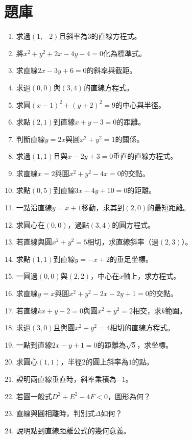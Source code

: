 \section{題庫}
\begin{enumerate}[label=\arabic*.]
    \item 求過$(1, -2)$且斜率為$3$的直線方程式。
    \item 將$x^2 + y^2 + 2x - 4y - 4 = 0$化為標準式。
    \item 求直線$2x - 3y + 6 = 0$的斜率與截距。
    \item 求過$(0, 0)$與$(3, 4)$的直線方程式。
    \item 求圓$(x - 1)^2 + (y + 2)^2 = 9$的中心與半徑。
    \item 求點$(2, 1)$到直線$x + y - 3 = 0$的距離。
    \item 判斷直線$y = 2x$與圓$x^2 + y^2 = 1$的關係。
    \item 求過$(1, 1)$且與$x - 2y + 3 = 0$垂直的直線方程式。
    \item 求直線$x = 2$與圓$x^2 + y^2 - 4x = 0$的交點。
    \item 求點$(0, 5)$到直線$3x - 4y + 10 = 0$的距離。
    \item 一點沿直線$y = x + 1$移動，求其到$(2, 0)$的最短距離。
    \item 求圓心在$(0, 0)$，過點$(3, 4)$的圓方程式。
    \item 若直線與圓$x^2 + y^2 = 5$相切，求直線斜率（過$(2, 3)$）。
    \item 求點$(1, 1)$到直線$y = -x + 2$的垂足坐標。
    \item 一圓過$(0, 0)$與$(2, 2)$，中心在$x$軸上，求方程式。
    \item 求直線$y = x$與圓$x^2 + y^2 - 2x - 2y + 1 = 0$的交點。
    \item 若直線$kx + y - 2 = 0$與圓$x^2 + y^2 = 2$相交，求$k$範圍。
    \item 求過$(3, 0)$且與圓$x^2 + y^2 = 4$相切的直線方程式。
    \item 一點到直線$2x - y + 1 = 0$的距離為$\sqrt{5}$，求坐標。
    \item 求圓心$(1, 1)$，半徑$2$的圓上斜率為$1$的點。
    \item 證明兩直線垂直時，斜率乘積為$-1$。
    \item 若圓一般式$D^2 + E^2 - 4F < 0$，圖形為何？
    \item 直線與圓相離時，判別式$\Delta$如何？
    \item 說明點到直線距離公式的幾何意義。

\end{enumerate}
